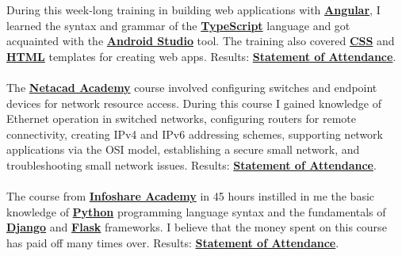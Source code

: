 \begin{rightcolumn}
            {During this week-long training in building web applications with \href{https://angular.io/}{\textbf{Angular}}, I learned the syntax and grammar of the \href{https://www.typescriptlang.org/}{\textbf{TypeScript}} language and got acquainted with the \href{https://developer.android.com/studio}{\textbf{Android Studio}} tool. The training also covered \href{https://developer.mozilla.org/en-US/docs/Web/CSS}{\textbf{CSS}} and \href{https://www.w3.org/}{\textbf{HTML}} templates for creating web apps.}
        {Results: \href{https://drive.google.com/file/d/1Q6IBp6MqAddaCwaZqZxMo0kMkV-l9WKb/view}{\textbf{Statement of Attendance}}.}\\
        \vspace{\itemspace}\\
            {The \href{https://www.netacad.com/}{\textbf{Netacad Academy}} course involved configuring switches and endpoint devices for network resource access. During this course I gained knowledge of Ethernet operation in switched networks, configuring routers for remote connectivity, creating IPv4 and IPv6 addressing schemes, supporting network applications via the OSI model, establishing a secure small network, and troubleshooting small network issues.}
        {Results: \href{https://drive.google.com/file/d/1vHRxM6J5HI5tNsH_mfFKZNjf9m25LXc9/view}{\textbf{Statement of Attendance}}.}\\
        \vspace{\itemspace}\\
            {The course from \href{https://infoshareacademy.com/}{\textbf{Infoshare Academy}} in 45 hours instilled in me the basic knowledge of \href{https://www.python.org/}{\textbf{Python}} programming language syntax and the fundamentals of \href{https://www.djangoproject.com/}{\textbf{Django}} and \href{https://flask.palletsprojects.com/}{\textbf{Flask}} frameworks. I believe that the money spent on this course has paid off many times over.}
        {Results: \href{https://drive.google.com/file/d/10PP3qx6BOw9ZF7lJsH-YOfFBLjtf5vl8/view}{\textbf{Statement of Attendance}}.}\\
        \vspace{\itemspace}\\

\end{rightcolumn}
